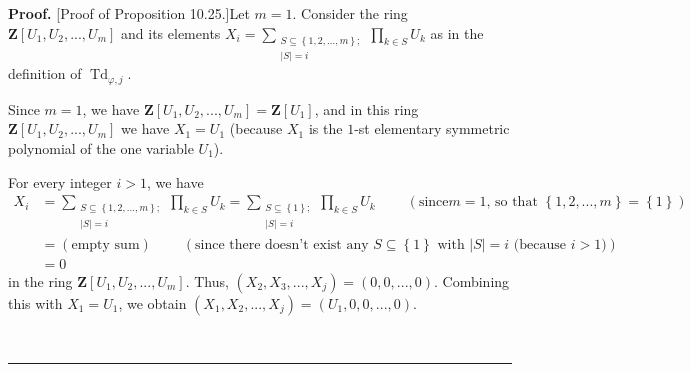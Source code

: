 \documentclass[numbers=enddot,12pt,final,onecolumn,notitlepage]{scrartcl}%
\newenvironment{proof}[1][Proof]{\noindent\textbf{#1.} }{\ \rule{0.5em}{0.5em}}
\begin{document}
\begin{proof}
[Proof of Proposition 10.25.]Let $m=1$. Consider the ring $\mathbf{Z}\left[
U_{1},U_{2},...,U_{m}\right]  $ and its elements $X_{i}=\sum
\limits_{\substack{S\subseteq\left\{  1,2,...,m\right\}  ;\\\left\vert
S\right\vert =i}}\prod\limits_{k\in S}U_{k}$ as in the definition of
$\operatorname*{Td}\nolimits_{\varphi,j}$.

Since $m=1$, we have $\mathbf{Z}\left[  U_{1},U_{2},...,U_{m}\right]
=\mathbf{Z}\left[  U_{1}\right]  $, and in this ring $\mathbf{Z}\left[
U_{1},U_{2},...,U_{m}\right]  $ we have $X_{1}=U_{1}$ (because $X_{1}$ is the
$1$-st elementary symmetric polynomial of the one variable $U_{1}$).

For every integer $i>1$, we have%
\begin{align*}
X_{i}  &  =\sum\limits_{\substack{S\subseteq\left\{  1,2,...,m\right\}
;\\\left\vert S\right\vert =i}}\prod\limits_{k\in S}U_{k}=\sum
\limits_{\substack{S\subseteq\left\{  1\right\}  ;\\\left\vert S\right\vert
=i}}\prod\limits_{k\in S}U_{k}\ \ \ \ \ \ \ \ \ \ \left(  \text{since
}m=1\text{, so that }\left\{  1,2,...,m\right\}  =\left\{  1\right\}  \right)
\\
&  =\left(  \text{empty sum}\right)  \ \ \ \ \ \ \ \ \ \ \left(  \text{since
there doesn't exist any }S\subseteq\left\{  1\right\}  \text{ with }\left\vert
S\right\vert =i\text{ (because }i>1\text{)}\right) \\
&  =0
\end{align*}
in the ring $\mathbf{Z}\left[  U_{1},U_{2},...,U_{m}\right]  $. Thus, $\left(
X_{2},X_{3},...,X_{j}\right)  =\left(  0,0,...,0\right)  $. Combining this
with $X_{1}=U_{1}$, we obtain $\left(  X_{1},X_{2},...,X_{j}\right)  =\left(
U_{1},0,0,...,0\right)  $.


\end{proof}
\end{document}
